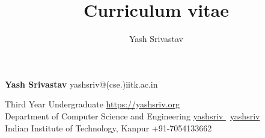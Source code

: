 \documentclass[10pt]{article}
\title{Curriculum vitae}
\author{Yash Srivastav}
\begin{document}

{\Huge\textbf{\sc Yash Srivastav}}
\hfill
yashsriv@(cse.)iitk.ac.in \faEnvelope


Third Year Undergraduate
\hfill
\href{https://yashsriv.org}{https://yashsriv.org \faHome}\\

Department of Computer Science and Engineering
\hfill
\href{https://github.com/yashsriv}{yashsriv \faGithub} \textbar \ 
\href{https://www.linkedin.com/in/yashsriv/}{yashsriv \faLinkedin} \\

Indian Institute of Technology, Kanpur
\hfill
+91-7054133662 \faMobile \\

\begin{minipage}[t]{0.49\textwidth}
  \vspace{3mm}
  
  
  
\end{minipage}
\hfill
\begin{minipage}[t]{0.49\textwidth}
  \vspace{3mm}
  
  
  
  
\end{minipage}
\end{document}
